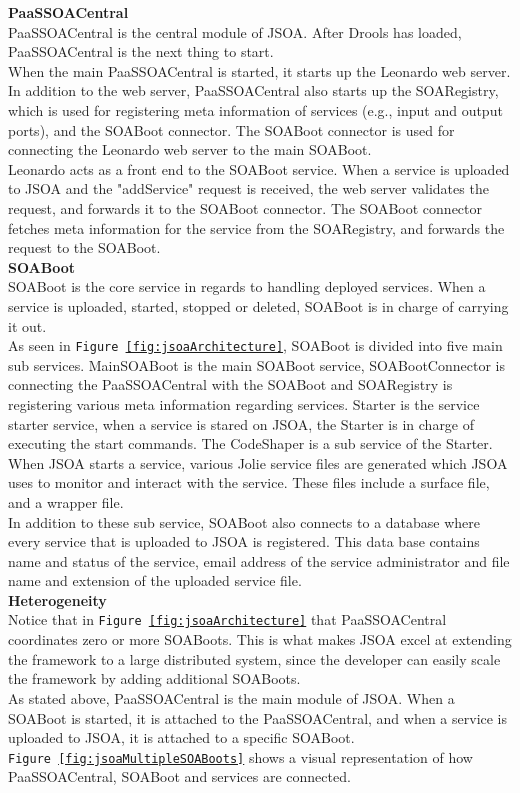 \documentclass[12pt,a4paper]{article}
\begin{document}
\textbf{PaaSSOACentral} \\
PaaSSOACentral is the central module of JSOA. After Drools has loaded, PaaSSOACentral is the next thing to start. \\
When the main PaaSSOACentral is started, it starts up the Leonardo\cite{leonardo_website} web server. In addition to the web server, PaaSSOACentral also starts up the SOARegistry, which is used for registering meta information of services (e.g., input and output ports), and the SOABoot connector. The SOABoot connector is used for connecting the Leonardo web server to the main SOABoot. \\
Leonardo acts as a front end to the SOABoot service. When a service is uploaded to JSOA and the "addService" request is received, the web server validates the request, and forwards it to the SOABoot connector. The SOABoot connector fetches meta information for the service from the SOARegistry, and forwards the request to the SOABoot. \\

\textbf{SOABoot} \\
SOABoot is the core service in regards to handling deployed services. When a service is uploaded, started, stopped or deleted, SOABoot is in charge of carrying it out.\\
As seen in \texttt{Figure \ref{fig:jsoaArchitecture}}, SOABoot is divided into five main sub services. MainSOABoot is the main SOABoot service, SOABootConnector is connecting the PaaSSOACentral with the SOABoot and SOARegistry is registering various meta information regarding services. Starter is the service starter service, when a service is stared on JSOA, the Starter is in charge of executing the start commands. The CodeShaper is a sub service of the Starter. When JSOA starts a service, various Jolie service files are generated which JSOA uses to monitor and interact with the service. These files include a surface file, and a wrapper file.\\
In addition to these sub service, SOABoot also connects to a database where every service that is uploaded to JSOA is registered. This data base contains name and status of the service, email address of the service administrator and file name and extension of the uploaded service file.\\

\textbf{Heterogeneity} \\
Notice that in \texttt{Figure \ref{fig:jsoaArchitecture}} that PaaSSOACentral coordinates zero or more SOABoots. This is what makes JSOA excel at extending the framework to a large distributed system, since the developer can easily scale the framework by adding additional SOABoots.\\
As stated above, PaaSSOACentral is the main module of JSOA. When a SOABoot is started, it is attached to the PaaSSOACentral, and when a service is uploaded to JSOA, it is attached to a specific SOABoot.\\
\texttt{Figure \ref{fig:jsoaMultipleSOABoots}} shows a visual representation of how PaaSSOACentral, SOABoot and services are connected.
\end{document}
